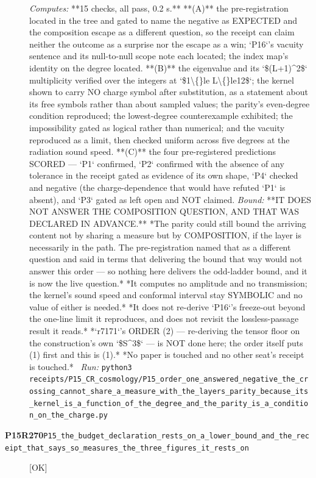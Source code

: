 \begin{description}
\emph{Computes:} **15 checks, all pass, 0.2 s.** **(A)** the pre-registration located in the tree and gated to name the negative as EXPECTED and the composition escape as a different question, so the receipt can claim neither the outcome as a surprise nor the escape as a win; `P16`'s vacuity sentence and its null-to-null scope note each located; the index map's identity on the degree located. **(B)** the eigenvalue and its `\$(L+1)\textasciicircum{}2\$` multiplicity verified over the integers at `\$1\textbackslash\{\}le L\textbackslash\{\}le12\$`; the kernel shown to carry NO charge symbol after substitution, as a statement about its free symbols rather than about sampled values; the parity's even-degree condition reproduced; the lowest-degree counterexample exhibited; the impossibility gated as logical rather than numerical; and the vacuity reproduced as a limit, then checked uniform across five degrees at the radiation sound speed. **(C)** the four pre-registered predictions SCORED --- `P1` confirmed, `P2` confirmed with the absence of any tolerance in the receipt gated as evidence of its own shape, `P4` checked and negative (the charge-dependence that would have refuted `P1` is absent), and `P3` gated as left open and NOT claimed.
 \emph{Bound:}  **IT DOES NOT ANSWER THE COMPOSITION QUESTION, AND THAT WAS DECLARED IN ADVANCE.** *The parity could still bound the arriving content not by sharing a measure but by COMPOSITION, if the layer is necessarily in the path. The pre-registration named that as a different question and said in terms that delivering the bound that way would not answer this order --- so nothing here delivers the odd-ladder bound, and it is now the live question.*  *It computes no amplitude and no transmission; the kernel's sound speed and conformal interval stay SYMBOLIC and no value of either is needed.*  *It does not re-derive `P16`'s freeze-out beyond the one-line limit it reproduces, and does not revisit the lossless-passage result it reads.*  *`r7171`'s ORDER (2) --- re-deriving the tensor floor on the construction's own `\$S\textasciicircum{}3\$` --- is NOT done here; the order itself puts (1) first and this is (1).*  *No paper is touched and no other seat's receipt is touched.*
\ \emph{Run:} \texttt{python3 receipts/P15\_CR\_cosmology/P15\_order\_one\_answered\_negative\_the\_crossing\_cannot\_share\_a\_measure\_with\_the\_layers\_parity\_because\_its\_kernel\_is\_a\_function\_of\_the\_degree\_and\_the\_parity\_is\_a\_condition\_on\_the\_charge.py}
\item[\rcptlabel{P15_the_budget_declaration_rests_on_a_lower_bound_and_the_receipt_that_says_so_measures_the_three_figures_it_rests_on}{P15R270}\textbf{P15R270}\quad\texttt{P15\_the\_budget\_declaration\_rests\_on\_a\_lower\_bound\_and\_the\_receipt\_that\_says\_so\_measures\_the\_three\_figures\_it\_rests\_on}]\hfill\textsf{[OK]}\\

\end{description}
